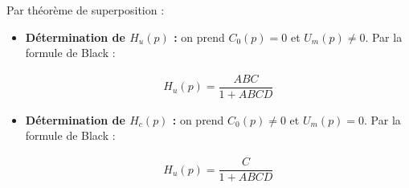 \ifprof
\begin{corrige}
Par théorème de superposition : 
\begin{itemize}
\item \textbf{Détermination de $H_u(p)$ : } on prend $C_0(p)=0$ et $U_m(p)\neq 0$.
Par la formule de Black : 

\begin{align*}
H_u(p)=\dfrac{ABC}{1+ABCD}
\end{align*}
\item \textbf{Détermination de $H_c(p)$ : } on prend $C_0(p)\neq 0$ et $U_m(p)= 0$.
Par la formule de Black : 

\begin{align*}
H_u(p)=\dfrac{C}{1+ABCD}
\end{align*}
\end{itemize}
\end{corrige}
\else
\fi

